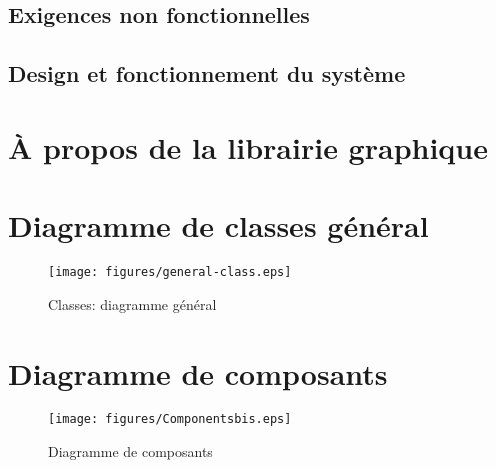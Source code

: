 \documentclass[a4paper, 11pt]{report}
\begin{document}
\section{Exigences non fonctionnelles}


\section{Design et fonctionnement du système}



\appendix

\chapter{À propos de la librairie graphique}


\chapter{Diagramme de classes général}
\begin{figure}[ht]
  \centering
  \texttt{[image: figures/general-class.eps]}
  \caption{\label{fig:Class:General} Classes: diagramme général}
\end{figure}

\chapter{Diagramme de composants}
\begin{figure}[ht]
  \centering
  \texttt{[image: figures/Componentsbis.eps]}
  \caption{\label{fig:CompleteComponents} Diagramme de composants}
\end{figure}

\printindex
\listoffigures
\end{document}
